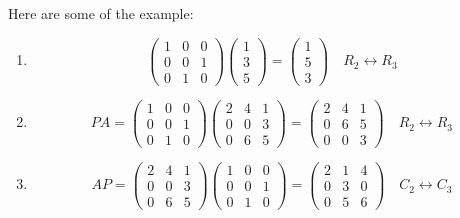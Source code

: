 \begin{eg}
    Here are some of the example:

\begin{enumerate}[label=$\arabic*^\circ$]
    \item \[
    \begin{pmatrix}
        1 & 0 & 0 \\
        0 & 0 & 1 \\
        0 & 1 & 0 
    \end{pmatrix} \begin{pmatrix}
        1 \\ 3 \\5
    \end{pmatrix} = \begin{pmatrix}
        1 \\ 5 \\ 3
    \end{pmatrix}
    \quad \boxed{R_2\leftrightarrow R_3}
    \]

    \item \[
    PA = \begin{pmatrix}
        1 & 0 & 0 \\
        0 & 0 & 1 \\
        0 & 1 & 0 
    \end{pmatrix} \begin{pmatrix}
        2 & 4 & 1 \\
        0 & 0 & 3 \\
        0 & 6 & 5
    \end{pmatrix} = \begin{pmatrix}
        2 & 4 & 1 \\
        0 & 6 & 5 \\
        0 & 0 & 3
    \end{pmatrix}
    \quad \boxed{R_2\leftrightarrow R_3}
    \] 
    
    \item \[
    AP = \begin{pmatrix}
        2 & 4 & 1 \\
        0 & 0 & 3 \\
        0 & 6 & 5
    \end{pmatrix} \begin{pmatrix}
        1 & 0 & 0 \\
        0 & 0 & 1 \\
        0 & 1 & 0 
    \end{pmatrix} = \begin{pmatrix}
        2 & 1 & 4 \\
        0 & 3 & 0 \\
        0 & 5 & 6 
    \end{pmatrix}
    \quad \boxed{C_2\leftrightarrow C_3}
    \]
\end{enumerate}
\end{eg}

